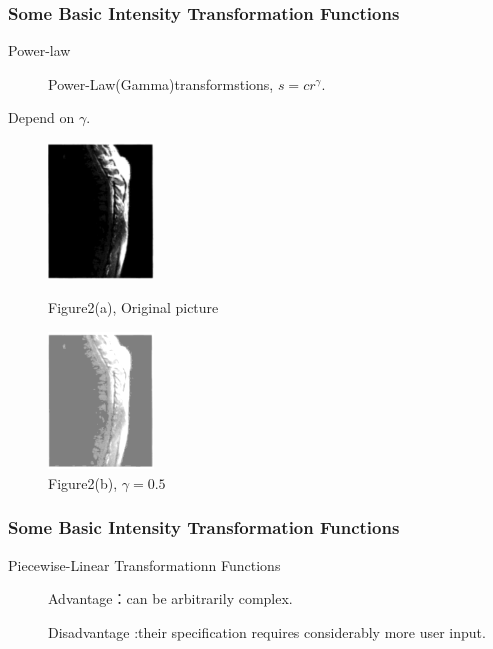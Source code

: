 \documentclass[notheorems, serif, table, compress]{beamer}  %
\begin{document}
\begin{frame}
\frametitle{Some Basic Intensity Transformation Functions}
    
\begin{description}
\item [Power-law] Power-Law(Gamma)transformstions, $s=cr^\gamma$.
\end{description}

  Depend on $\gamma$.

\begin{figure}[!ht]
  \begin{minipage}[t]{0.4\textwidth}	
  \centering
  \includegraphics[width=1.1in]{spine.png}
  \caption{Figure2(a), Original picture}
  \end{minipage}
  \begin{minipage}[t]{0.4\textwidth}
  \centering
  \includegraphics[width=1.1in]{spineout.png}
  \caption{Figure2(b), $\gamma=0.5$}
  \end{minipage}
  \end{figure} 

\end{frame}



\begin{frame}
\frametitle{Some Basic Intensity Transformation Functions}
    
\begin{description}
 \item[Piecewise-Linear Transformationn Functions]

Advantage：can be arbitrarily complex.

Disadvantage :their specification requires considerably more user input.
\end{description}

\end{frame}
\end{document}
